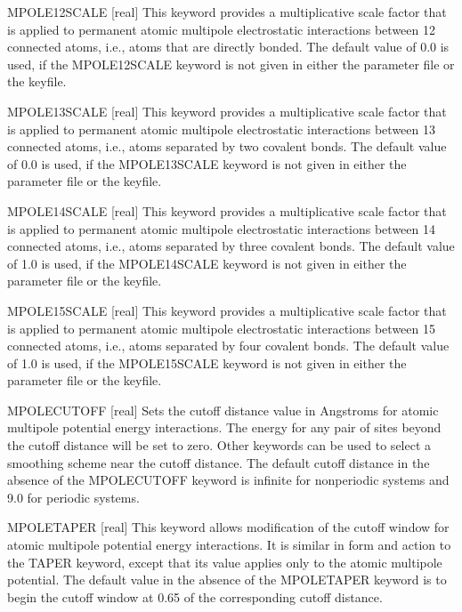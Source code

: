 \documentclass[letterpaper,11pt,english]{sphinxmanual}
\begin{document}
MPOLE\sphinxhyphen{}12\sphinxhyphen{}SCALE {[}real{]}     This keyword provides a multiplicative scale factor that is applied to permanent atomic multipole electrostatic interactions between 1\sphinxhyphen{}2 connected atoms, i.e., atoms that are directly bonded. The default value of 0.0 is used, if the MPOLE\sphinxhyphen{}12\sphinxhyphen{}SCALE keyword is not given in either the parameter file or the keyfile.

MPOLE\sphinxhyphen{}13\sphinxhyphen{}SCALE {[}real{]}     This keyword provides a multiplicative scale factor that is applied to permanent atomic multipole  electrostatic interactions between 1\sphinxhyphen{}3 connected atoms, i.e., atoms separated by two covalent bonds. The default value of 0.0 is used, if the MPOLE\sphinxhyphen{}13\sphinxhyphen{}SCALE keyword is not given in either the parameter file or the keyfile.

MPOLE\sphinxhyphen{}14\sphinxhyphen{}SCALE {[}real{]}     This keyword provides a multiplicative scale factor that is applied to permanent atomic multipole  electrostatic interactions between 1\sphinxhyphen{}4 connected atoms, i.e., atoms separated by three covalent bonds. The default value of 1.0 is used, if the MPOLE\sphinxhyphen{}14\sphinxhyphen{}SCALE keyword is not given in either the parameter file or the keyfile.

MPOLE\sphinxhyphen{}15\sphinxhyphen{}SCALE {[}real{]}     This keyword provides a multiplicative scale factor that is applied to permanent atomic multipole  electrostatic interactions between 1\sphinxhyphen{}5 connected atoms, i.e., atoms separated by four covalent bonds. The default value of 1.0 is used, if the MPOLE\sphinxhyphen{}15\sphinxhyphen{}SCALE keyword is not given in either the parameter file or the keyfile.

MPOLE\sphinxhyphen{}CUTOFF {[}real{]}     Sets the cutoff distance value in Angstroms for atomic multipole potential energy interactions. The energy for any pair of sites beyond the cutoff distance will be set to zero. Other keywords can be used to select a smoothing scheme near the cutoff distance. The default cutoff distance in the absence of the MPOLE\sphinxhyphen{}CUTOFF keyword is infinite for nonperiodic systems and 9.0 for periodic systems.

MPOLE\sphinxhyphen{}TAPER {[}real{]}     This keyword allows modification of the cutoff window for atomic multipole potential energy interactions. It is similar in form and action to the TAPER keyword, except that its value applies only to the atomic multipole potential. The default value in the absence of the MPOLE\sphinxhyphen{}TAPER keyword is to begin the cutoff window at 0.65 of the corresponding cutoff distance.
\end{document}
